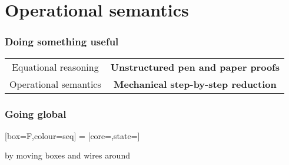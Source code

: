 \section{Operational semantics}

\begin{frame}
    \frametitle{Doing something useful}
    \centering
    \Large
    \pause
    \begin{tabular}{cc}
        \alert{Equational reasoning}
        &
        \pause
        \textbf{Unstructured pen and paper proofs}
        \\[1em]
        \pause
        \alert{Operational semantics}
        &
        \pause
        \textbf{Mechanical step-by-step reduction}
    \end{tabular}
\end{frame}
\begin{frame}
    \frametitle{Going global}

    \centering

    [box=F,colour=seq]
    \Large=\normalsize
    [core=,state=]

    \vspace{1em}
    \Large
    by moving boxes and wires around
\end{frame}


